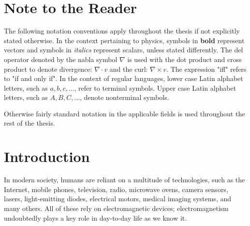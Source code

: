 



\chapter{Note to the Reader}
The following notation conventions apply throughout the thesis if not explicitly stated otherwise.  In the context pertaining to physics, symbols in \textbf{bold} represent vectors and symbols in \textit{italics} represent scalars, unless stated differently.
The del operator denoted by the nabla symbol $\nabla$ is used with the dot product and cross product to denote divergence: $\nabla \cdot v$ and the curl: $\nabla \times v$.
The expression "iff" refers to "if and only if".
In the context of regular languages, lower case Latin alphabet letters, such as $a, b, c, \dots$, refer to terminal symbols. Upper case Latin alphabet letters, such as $A, B, C,\dots$, denote nonterminal symbols.

Otherwise fairly standard notation in the applicable fields is used throughout the rest of the thesis. 

\chapter{Introduction}
In modern society, humans are reliant on a multitude of technologies, such as the Internet, mobile phones, television, radio, microwave ovens, camera sensors, lasers, light-emitting diodes, electrical motors, medical imaging systems, and many others. All of these rely on electromagnetic devices; electromagnetism undoubtedly plays a key role in day-to-day life as we know it.


